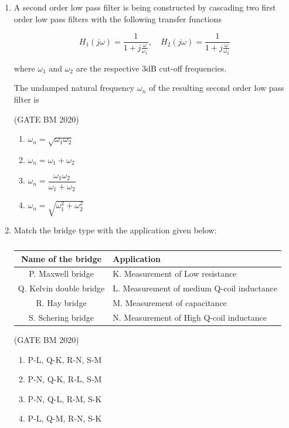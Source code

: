 \documentclass[journal]{IEEEtran}
\begin{document}
\begin{enumerate}
\item A second order low pass filter is being constructed by cascading two first order low pass filters with the following transfer functions

\[
H_1(j\omega) = \frac{1}{1 + j \frac{\omega}{\omega_1}}, 
\quad 
H_2(j\omega) = \frac{1}{1 + j \frac{\omega}{\omega_2}}
\]

where $\omega_1$ and $\omega_2$ are the respective 3dB cut-off frequencies.  

The undamped natural frequency $\omega_n$ of the resulting second order low pass filter is


\hfill(GATE BM 2020)
\begin{multicols}{2}
\begin{enumerate}
\item $\omega_n = \sqrt{\omega_1 \omega_2}$
\item $\omega_n = \omega_1 + \omega_2$
\item $\omega_n = \dfrac{\omega_1 \omega_2}{\omega_1 + \omega_2}$
\item $\omega_n = \sqrt{\omega_1^2 + \omega_2^2}$
\end{enumerate}
\end{multicols}

\item Match the bridge type with the application given below:


	
	\begin{table}[H]
	\centering\normalsize
\begin{tabular}{|c|l|}
\hline
\textbf{Name of the bridge} & \textbf{Application} \\
\hline
P. Maxwell bridge        & K. Measurement of Low resistance \\
Q. Kelvin double bridge  & L. Measurement of medium Q-coil inductance \\
R. Hay bridge            & M. Measurement of capacitance \\
S. Schering bridge       & N. Measurement of High Q-coil inductance \\
\hline
\end{tabular}
\caption{}                                   
\label{tab:Q43}                              
\end{table}


\hfill(GATE BM 2020)
\begin{multicols}{2}
\begin{enumerate}
\item P-L, Q-K, R-N, S-M
\item P-N, Q-K, R-L, S-M
\item P-N, Q-L, R-M, S-K
\item P-L, Q-M, R-N, S-K
\end{enumerate}
\end{multicols}



\end{enumerate}
\end{document}
